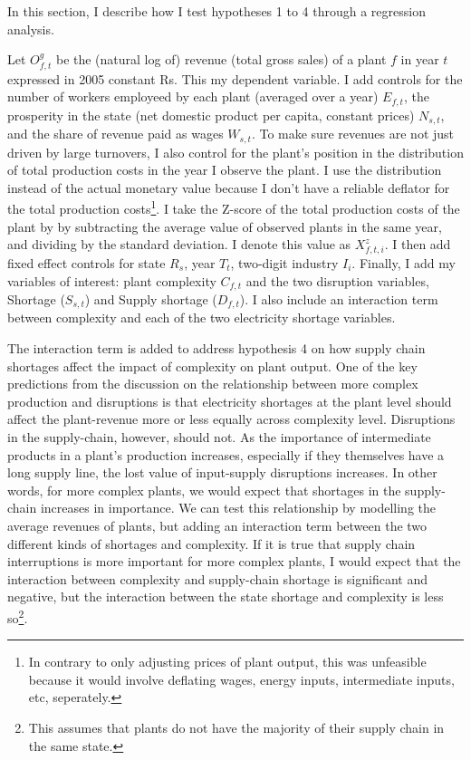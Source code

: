 \documentclass[11pt]{article}
\begin{document}
In this section, I describe how I test hypotheses 1 to 4 through a regression analysis.

Let $O^{g}_{f,t}$ be the (natural log of) revenue (total gross sales) of a plant $f$ in year $t$ expressed in 2005 constant Rs. This my dependent variable. I add controls for the number of workers employeed by each plant (averaged over a year) $E_{f,t}$, the prosperity in the state (net domestic product per capita, constant prices) $N_{s,t}$, and the share of revenue paid as wages $W_{s,t}$. To make sure revenues are not just driven by large turnovers, I also control for the plant's position in the distribution of total production costs in the year I observe the plant. I use the distribution instead of the actual monetary value because I don't have a reliable deflator for the total production costs\footnote{In contrary to only adjusting prices of plant output, this was unfeasible because it would involve deflating wages, energy inputs, intermediate inputs, etc, seperately.}. I take the Z-score of the total production costs of the plant by by subtracting the average value of observed plants in the same year, and dividing by the standard deviation. I denote this value as $X^{z}_{f,t,i}$. I then add fixed effect controls for state $R_{s}$, year $T_{t}$, two-digit industry $I_i$. Finally, I add my variables of interest: plant complexity $C_{f,t}$ and the two disruption variables, Shortage ($S_{s,t}$) and Supply shortage ($D_{f,t}$). I also include an interaction term between complexity and each of the two electricity shortage variables.

The interaction term is added to address hypothesis 4 on how supply chain shortages affect the impact of complexity on plant output. One of the key predictions from the discussion on the relationship between more complex production and disruptions is that electricity shortages at the plant level should affect the plant-revenue more or less equally across complexity level. Disruptions in the supply-chain, however, should not. As the importance of intermediate products in a plant's production increases, especially if they themselves have a long supply line, the lost value of input-supply disruptions increases. In other words, for more complex plants, we would expect that shortages in the supply-chain increases in importance. We can test this relationship by modelling the average revenues of plants, but adding an interaction term between the two different kinds of shortages and complexity. If it is true that supply chain interruptions is more important for more complex plants, I would expect that the interaction between complexity and supply-chain shortage is significant and negative, but the interaction between the state shortage and complexity is less so\footnote{This assumes that plants do not have the majority of their supply chain in the same state.}.
\end{document}
